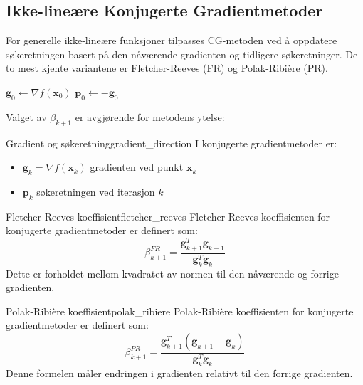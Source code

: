 \subsection{Ikke-lineære Konjugerte Gradientmetoder}
For generelle ikke-lineære funksjoner tilpasses CG-metoden ved å oppdatere søkeretningen basert på den nåværende gradienten og tidligere søkeretninger. De to mest kjente variantene er Fletcher-Reeves (FR) og Polak-Ribière (PR).

\begin{algorithm}[H]
	\SetAlgoLined
	\(\symbf{g}_0 \gets \nabla f(\symbf{x}_0)\) 
	\(\symbf{p}_0 \gets -\symbf{g}_0\) 
	\caption{Ikke-lineær Konjugert Gradient Metode}
\end{algorithm}

Valget av \(\beta_{k+1}\) er avgjørende for metodens ytelse:
\begin{definition}{Gradient og søkeretning}{gradient_direction}
	I konjugerte gradientmetoder er:
	\begin{itemize}
		\item \(\symbf{g}_k = \nabla f(\symbf{x}_k)\) gradienten ved punkt \(\symbf{x}_k\)
		\item \(\symbf{p}_k\) søkeretningen ved iterasjon \(k\)
	\end{itemize}
\end{definition}

\begin{definition}{Fletcher-Reeves koeffisient}{fletcher_reeves}
	Fletcher-Reeves koeffisienten for konjugerte gradientmetoder er definert som:
	\[
		\beta_{k+1}^{FR} = \frac{\symbf{g}_{k+1}^T\symbf{g}_{k+1}}{\symbf{g}_k^T\symbf{g}_k}
	\]
	Dette er forholdet mellom kvadratet av normen til den nåværende og forrige gradienten.
\end{definition}

\begin{definition}{Polak-Ribière koeffisient}{polak_ribiere}
	Polak-Ribière koeffisienten for konjugerte gradientmetoder er definert som:
	\[
		\beta_{k+1}^{PR} = \frac{\symbf{g}_{k+1}^T(\symbf{g}_{k+1} - \symbf{g}_k)}{\symbf{g}_k^T\symbf{g}_k}
	\]
	Denne formelen måler endringen i gradienten relativt til den forrige gradienten.
\end{definition}

